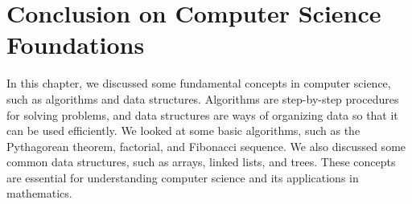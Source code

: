 \section{Conclusion on Computer Science Foundations}

In this chapter, we discussed some fundamental concepts in computer science, such as algorithms and data structures. Algorithms are step-by-step procedures for solving problems, and data structures are ways of organizing data so that it can be used efficiently. We looked at some basic algorithms, such as the Pythagorean theorem, factorial, and Fibonacci sequence. We also discussed some common data structures, such as arrays, linked lists, and trees. These concepts are essential for understanding computer science and its applications in mathematics.
